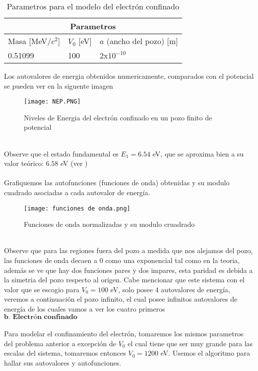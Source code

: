 \documentclass[9pt,twocolumn,twoside]{osajnl}
\begin{document}
\begin{table}[h!]
\Centering
\begin{tabular}{ |p{2.0cm}|p{2.0cm}|p{2.0cm}|  }
 \hline
 \multicolumn{3}{|c|}{Parametros } \\
 \hline
 Masa [MeV/$c^2$] & $V_0$ [eV] &  $a$ (ancho del pozo) [m]\\[0.2ex] 
 \hline
 0.51099   &   100  & $2$x$10^{-10}$ \\[0.1ex]
\hline
\end{tabular}
\caption{Parametros para el modelo del electrón confinado}
\end{table}
Los autovalores de energia obtenidos numericamente, comparados con el potencial se pueden ver en la siguente imagen \par
\begin{figure}[H]
    \centering
    \texttt{[image: NEP.PNG]}
    \caption{Niveles de Energia del electrón confinado en un pozo finito de potencial}
    \label{fig:my_label}
\end{figure}
\\
Observe que el estado fundamental es $E_1=6.54$ eV, que se aproxima bien a su valor teórico: $6.58$ eV  (ver \cite{RaymondA2005}) \\ \\
Grafiquemos las autofunciones (funciones de onda) obtenidas y su modulo cuadrado asociadas a cada autovalor de energía.
\\
\begin{figure}[H]
    \centering
    \texttt{[image: funciones de onda.png]}
    \caption{Funciones de onda normalizadas y su modulo cruadrado}
    \label{fig:my_label}
\end{figure}
\\
Observe que  para las regiones fuera del pozo a medida que nos alejamos del pozo, las funciones de onda decaen a $0$ como una exponencial tal como en la teoria, además se ve que hay dos funciones pares y dos impares, esta paridad es debida a la simetria del pozo respecto al origen. Cabe mencionar que este sistema con el valor que se escogio para $V_0=100$ eV, solo posee 4 autovalores de energía, veremos a continuación el pozo infinito, el cual posee infinitos autovalores de energía de los cuales vamos a ver los cuatro primeros \\ 

$\textbf{b. Electrón confinado}$ \\ \\
Para modelar el confinamiento del electrón, tomaremos los mismos parametros del problema anterior a excepción de $V_0$ el cual tiene que ser muy grande para las escalas del sistema, tomaremos entonces $V_0=1200$ eV. Usemos el algoritmo para hallar sus autovalores y autofunciones.
\end{document}
